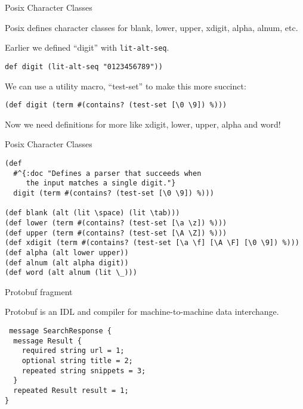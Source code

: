 \documentclass[presentation]{beamer}
\begin{document}
\begin{frame}[fragile]{Posix Character Classes}

 Posix defines character classes for blank, lower, upper,
 xdigit, alpha, alnum, etc.

 Earlier we defined ``digit''  with \texttt{lit-alt-seq}.

\begin{verbatim}
def digit (lit-alt-seq "0123456789"))
\end{verbatim}

We can use a utility macro, ``test-set'' to make this more
succinct:

\begin{verbatim}
(def digit (term #(contains? (test-set [\0 \9]) %)))
\end{verbatim}

Now we need definitions for more like xdigit, lower, upper, alpha and
word!
\end{frame}

\begin{frame}[fragile]{Posix Character Classes}


\begin{verbatim}
(def
  #^{:doc "Defines a parser that succeeds when
     the input matches a single digit."}
  digit (term #(contains? (test-set [\0 \9]) %)))

(def blank (alt (lit \space) (lit \tab)))
(def lower (term #(contains? (test-set [\a \z]) %)))
(def upper (term #(contains? (test-set [\A \Z]) %)))
(def xdigit (term #(contains? (test-set [\a \f] [\A \F] [\0 \9]) %)))
(def alpha (alt lower upper))
(def alnum (alt alpha digit))
(def word (alt alnum (lit \_)))
\end{verbatim}

\end{frame}

\begin{frame}[fragile]{Protobuf fragment}

  Protobuf is an IDL and compiler for machine-to-machine data
  interchange.

\begin{verbatim}
 message SearchResponse {
  message Result {
    required string url = 1;
    optional string title = 2;
    repeated string snippets = 3;
  }
  repeated Result result = 1;
}
\end{verbatim}
\end{frame}
\end{document}
